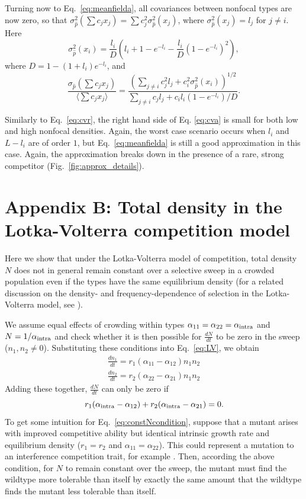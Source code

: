 \documentclass[12pt]{article}
\begin{document}
Turning now to Eq.~\eqref{eq:meanfielda}, all covariances between nonfocal types are now zero, so that $\sigma_{\hat{p}}^2(\sum c_j x_j)=\sum c_j^2 \sigma_{\hat{p}}^2(x_j)$, where $\sigma_{\hat{p}}^2(x_j)=l_j$ for $j\neq i$. Here  
\begin{equation}
\sigma_{\hat{p}}^2(x_i)=\frac{l_i}{D}\left(l_i+1-e^{-l_i}-\frac{l_i}{D}\left(1-e^{-l_i}\right)^2\right),
\end{equation}
where $D= 1-(1+l_i)e^{-l_i}$, and 
\begin{equation}
\frac{\sigma_{\hat{p}}(\sum c_j x_j)}{\langle\sum c_j x_j\rangle} = \frac{\left(\sum_{j\neq i} c_j^2 l_j + c_i^2 \sigma_{\hat{p}}^2(x_i)\right)^{1/2}}{\sum_{j\neq i} c_j l_j + c_i l_i (1-e^{-l_i})/D} \label{eq:cva}.
\end{equation}

Similarly to Eq.~\eqref{eq:cvr}, the right hand side of Eq. \eqref{eq:cva} is small for both low and high nonfocal densities. Again, the worst case scenario occurs when $l_i$ and $L-l_i$ are of order $1$, but Eq.~\eqref{eq:meanfielda} is still a good approximation in this case. Again, the approximation breaks down in the presence of a rare, strong competitor (Fig.~\ref{fig:approx_details}).

\section*{Appendix B: Total density in the Lotka-Volterra competition model}

Here we show that under the Lotka-Volterra model of competition, total density $N$ does not in general remain constant over a selective sweep in a crowded population even if the types have the same equilibrium density (for a related discussion on the density- and frequency-dependence of selection in the Lotka-Volterra model, see \citep{smouse_1976,mallet_2012}).

We assume equal effects of crowding within types $\alpha_{11}=\alpha_{22}=\alpha_{\rm intra}$ and $N=1/\alpha_{\rm intra}$ and check whether it is then possible for $\frac{dN}{dt}$ to be zero in the sweep ($n_1,n_2 \neq 0$). Substituting these conditions into Eq.~\eqref{eq:LV}, we obtain 
\begin{align}
\frac{d n_1}{dt} = r_1(\alpha_{11}-\alpha_{12})n_1n_2 \nonumber\\
\frac{d n_2}{dt} = r_2(\alpha_{22}-\alpha_{21})n_1n_2
\end{align}
Adding these together, $\frac{dN}{dt}$ can only be zero if 
\begin{equation}
r_1(\alpha_{\rm intra}-\alpha_{12})+r_2(\alpha_{\rm intra}-\alpha_{21})=0. \label{eq:constNcondition}
\end{equation}
To get some intuition for Eq.~\eqref{eq:constNcondition}, suppose that a mutant arises with improved competitive ability but identical intrinsic growth rate and equilibrium density ($r_1=r_2$ and $\alpha_{11}=\alpha_{22}$). This could represent a mutation to an interference competition trait, for example \citep{gill_1974}. Then, according the above condition, for $N$ to remain constant over the sweep, the mutant must find the wildtype more tolerable than itself by exactly the same amount that the wildtype finds the mutant less tolerable than itself. 
\end{document}

